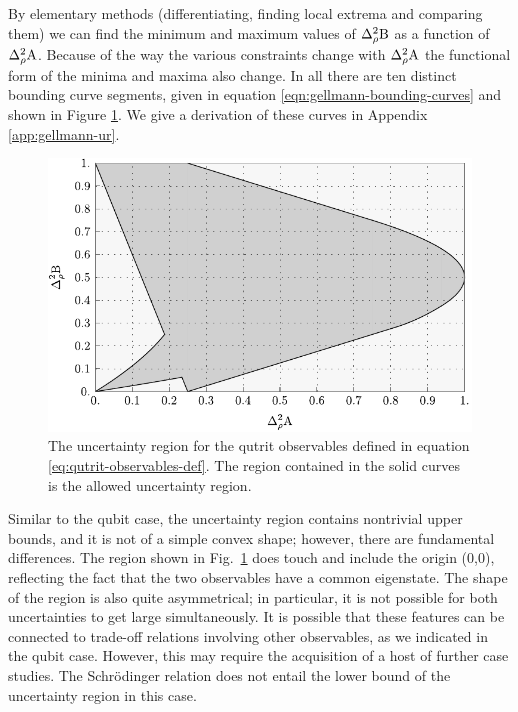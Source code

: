 By elementary methods (differentiating, finding local extrema and comparing them) we can find the minimum and maximum values of $\varr{\opb}$ as a function of $\varr{\opa}$. Because of the way the various constraints change with $\varr{\opa}$ the functional form of the minima and maxima also change. In all there are ten distinct bounding curve segments, given in equation \eqref{eqn:gellmann-bounding-curves} and shown in Figure \ref{fig:qutrit-uncertainty-region}. We give a derivation of these curves in Appendix \ref{app:gellmann-ur}.
\begin{center}
  \begin{figure}[ht]
    \includegraphics[width=.8\textwidth]{figs/full-gellmann-ur}
    \caption[The uncertainty region for the qutrit observables defined in equation \eqref{eq:qutrit-observables-def}]{The uncertainty region for the qutrit observables defined in equation \eqref{eq:qutrit-observables-def}. The region contained in the solid curves is the allowed uncertainty region.}
    \label{fig:qutrit-uncertainty-region}
  \end{figure}
\end{center}

Similar to the qubit case, the uncertainty region contains nontrivial upper bounds, and it is not of a simple convex shape; however, there are fundamental differences. The region shown in Fig.~\ref{fig:qutrit-uncertainty-region} does touch and include the origin (0,0), reflecting the fact that the two observables have a common eigenstate. The shape of the region is also quite asymmetrical; in particular, it is not possible for both uncertainties to get large simultaneously. It is possible that these features can be connected to trade-off relations involving other observables, as we indicated in the qubit case. However, this may require the acquisition of a host of further case studies.
The Schr\"odinger relation does not entail the lower bound of the uncertainty region in this case. 

